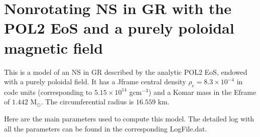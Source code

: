 \documentclass[letterpaper,10pt,english]{sphinxmanual}
\begin{document}
\section{Non\sphinxhyphen{}rotating NS in GR with the POL2 EoS and a purely poloidal magnetic field}
\label{\detokenize{examples_gr:non-rotating-ns-in-gr-with-the-pol2-eos-and-a-purely-poloidal-magnetic-field}}
\sphinxAtStartPar
This is a model of an NS in GR described by the analytic POL2 EoS, endowed with a purely poloidal field. It has a J\sphinxhyphen{}frame central density \(\rho _\mathrm{c}=8.3\times 10^{-4}\) in code units (corresponding to \(5.15\times 10^{14}\) gcm\(^{-3}\)) and a Komar mass in the E\sphinxhyphen{}frame of \(1.442\) M\( _\odot\). The circumferential radius is \(16.559\) km.

\sphinxAtStartPar
Here are the main parameters used to compute this model. The detailed log with all the parameters can be found in the corresponding LogFile.dat.

\begin{sphinxVerbatim}[commandchars=\\\{\}]
                    
                 
              
                 
              
\end{sphinxVerbatim}
\end{document}
